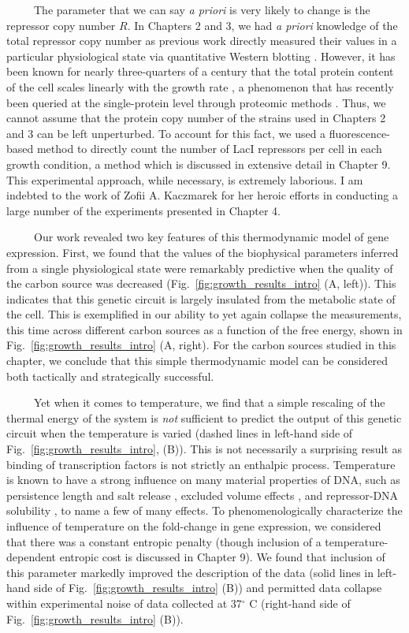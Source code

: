 \documentclass[12pt]{caltech_thesis}
\begin{document}
~~~~~The parameter that we can say \emph{a priori} is very likely to
change is the repressor copy number \(R\). In Chapters 2 and 3, we had
\emph{a priori} knowledge of the total repressor copy number as previous
work directly measured their values in a particular physiological state
via quantitative Western blotting \autocite{garcia2011}. However, it has
been known for nearly three-quarters of a century that the total protein
content of the cell scales linearly with the growth rate
\autocite{schaechter1958,jun2018}, a phenomenon that has recently been
queried at the single-protein level through proteomic methods
\autocite{schmidt2016,li2014,valgepea2013a,peebo2015}. Thus, we cannot
assume that the protein copy number of the strains used in Chapters 2
and 3 can be left unperturbed. To account for this fact, we used a
fluorescence-based method to directly count the number of LacI
repressors per cell in each growth condition, a method which is
discussed in extensive detail in Chapter 9. This experimental approach,
while necessary, is extremely laborious. I am indebted to the work of
Zofii A. Kaczmarek for her heroic efforts in conducting a large number
of the experiments presented in Chapter 4.

~~~~~Our work revealed two key features of this thermodynamic model of
gene expression. First, we found that the values of the biophysical
parameters inferred from a single physiological state were remarkably
predictive when the quality of the carbon source was decreased
(Fig.~\ref{fig:growth_results_intro} (A, left)). This indicates that
this genetic circuit is largely insulated from the metabolic state of
the cell. This is exemplified in our ability to yet again collapse the
measurements, this time across different carbon sources as a function of
the free energy, shown in Fig.~\ref{fig:growth_results_intro} (A,
right). For the carbon sources studied in this chapter, we conclude that
this simple thermodynamic model can be considered both tactically and
strategically successful.

~~~~~Yet when it comes to temperature, we find that a simple rescaling
of the thermal energy of the system is \emph{not} sufficient to predict
the output of this genetic circuit when the temperature is varied
(dashed lines in left-hand side of Fig.~\ref{fig:growth_results_intro},
(B)). This is not necessarily a surprising result as binding of
transcription factors is not strictly an enthalpic process. Temperature
is known to have a strong influence on many material properties of DNA,
such as persistence length and salt release \autocite{goethe2015},
excluded volume effects \autocite{driessen2014}, and repressor-DNA
solubility \autocite{elf2007}, to name a few of many effects. To
phenomenologically characterize the influence of temperature on the
fold-change in gene expression, we considered that there was a constant
entropic penalty (though inclusion of a temperature-dependent entropic
cost is discussed in Chapter 9). We found that inclusion of this
parameter markedly improved the description of the data (solid lines in
left-hand side of Fig.~\ref{fig:growth_results_intro} (B)) and permitted
data collapse within experimental noise of data collected at
37\(^\circ\) C (right-hand side of Fig.~\ref{fig:growth_results_intro}
(B)).
\end{document}
